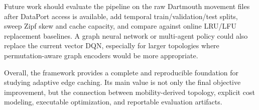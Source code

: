 Future work should evaluate the pipeline on the raw Dartmouth movement files after DataPort access is available, add temporal train/validation/test splits, sweep Zipf skew and cache capacity, and compare against online LRU/LFU replacement baselines. A graph neural network or multi-agent policy could also replace the current vector DQN, especially for larger topologies where permutation-aware graph encoders would be more appropriate.

Overall, the framework provides a complete and reproducible foundation for studying adaptive edge caching. Its main value is not only the final objective improvement, but the connection between mobility-derived topology, explicit cost modeling, executable optimization, and reportable evaluation artifacts.
